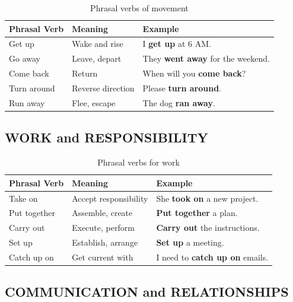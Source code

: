 \begin{table}[h]
\centering
\begin{tabular}{|l|l|l|}
\hline
\textbf{Phrasal Verb} & \textbf{Meaning} & \textbf{Example} \\
\hline
Get up & Wake and rise & I \textbf{get up} at 6 AM. \\
\hline
Go away & Leave, depart & They \textbf{went away} for the weekend. \\
\hline
Come back & Return & When will you \textbf{come back}? \\
\hline
Turn around & Reverse direction & Please \textbf{turn around}. \\
\hline
Run away & Flee, escape & The dog \textbf{ran away}. \\
\hline
\end{tabular}
\caption{Phrasal verbs of movement}
\end{table}

\subsection{WORK and RESPONSIBILITY}

\begin{table}[h]
\centering
\begin{tabular}{|l|l|l|}
\hline
\textbf{Phrasal Verb} & \textbf{Meaning} & \textbf{Example} \\
\hline
Take on & Accept responsibility & She \textbf{took on} a new project. \\
\hline
Put together & Assemble, create & \textbf{Put together} a plan. \\
\hline
Carry out & Execute, perform & \textbf{Carry out} the instructions. \\
\hline
Set up & Establish, arrange & \textbf{Set up} a meeting. \\
\hline
Catch up on & Get current with & I need to \textbf{catch up on} emails. \\
\hline
\end{tabular}
\caption{Phrasal verbs for work}
\end{table}

\subsection{COMMUNICATION and RELATIONSHIPS}

